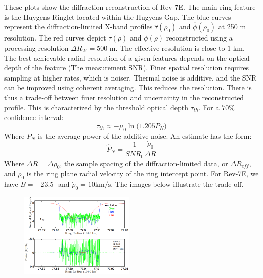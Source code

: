 \documentclass{article}
\theoremstyle{mystyle}
\begin{document}
\noindent These plots show the diffraction reconstruction of Rev-7E. The main ring feature is the Huygens Ringlet located within the Hugyens Gap. The blue curves represent the diffraction-limited X-band profiles $\hat{\tau}(\rho_0)$ and $\hat{\phi}(\rho_0)$ at 250 m resolution. The red curves depict $\tau(\rho)$ and $\phi(\rho)$ reconstructed using a processing resolution $\Delta R_{W} = 500$ m. The effective resolution is close to $1$ km. The best achievable radial resolution of a given features depends on the optical depth of the feature (The measurement SNR). Finer spatial resolution requires sampling at higher rates, which is noiser. Thermal noise is additive, and the SNR can be improved using coherent averaging. This reduces the resolution. There is thus a trade-off between finer resolution and uncertainty in the reconstructed profile. This is characterized by the threshold optical depth $\tau_{th}$. For a $70\%$ confidence interval:
\begin{equation}
\tau_{th} \approx -\mu_0\ln\big(1.205 P_N\big)
\end{equation}
Where $P_N$ is the average power of the additive noise. An estimate has the form:
\begin{equation}
\hat{P}_N = \frac{1}{SNR_0}\frac{\dot{\rho}_0}{\Delta R}
\end{equation}
Where $\Delta R = \Delta \rho_0$, the sample spacing of the diffraction-limited data, or $\Delta R_{eff}$, and $\dot{\rho}_0$ is the ring plane radial velocity of the ring intercept point. For Rev-7E, we have $B = -23.5^{\circ}$ and $\dot{\rho}_0 = 10 \textrm{km/s}$. The images below illustrate the trade-off.

\begin{figure}
	\begin{center}
	\includegraphics[width = 0.49\textwidth]{USER_11}
	\end{center}
\end{figure}
\end{document}
